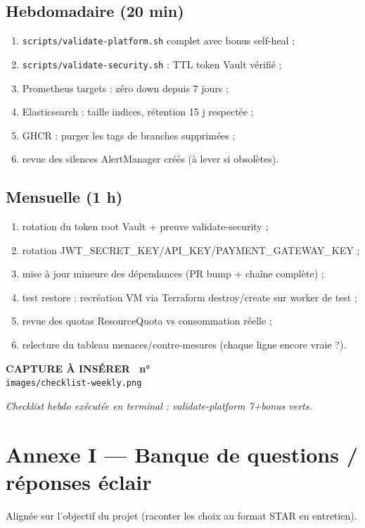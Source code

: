 \documentclass[12pt,a4paper]{article}
\newcounter{capturecount}
\newcommand{\capturebox}[2]{%
\par\vspace{4mm}
\begin{tcolorbox}[enhanced,colback=yellow!5,colframe=black!55,boxrule=0.7pt,
  borderline={0.7pt}{0pt}{black!40,dashed},
  arc=2mm,left=6pt,right=6pt,top=7pt,bottom=7pt]
\centering
{\normalsize\sffamily\bfseries CAPTURE À INSÉRER \textbar\ n°\,\stepcounter{capturecount}\thecapturecount}\\[3pt]
{\large\texttt{images/#2}}\\[7pt]
\begin{minipage}{0.94\linewidth}\centering\itshape #1\end{minipage}
\end{tcolorbox}
\par\vspace{2mm}}
\begin{document}
\subsection*{Hebdomadaire (20 min)}
\begin{enumerate}[itemsep=1pt]
  \item \texttt{scripts/validate-platform.sh} complet avec bonus self-heal ;
  \item \texttt{scripts/validate-security.sh} : TTL token Vault vérifié ;
  \item Prometheus targets : zéro down depuis 7 jours ;
  \item Elasticsearch : taille indices, rétention 15 j respectée ;
  \item GHCR : purger les tags de branches supprimées ;
  \item revue des silences AlertManager créés (à lever si obsolètes).
\end{enumerate}

\subsection*{Mensuelle (1 h)}
\begin{enumerate}[itemsep=1pt]
  \item rotation du token root Vault + preuve validate-security ;
  \item rotation JWT\_SECRET\_KEY/API\_KEY/PAYMENT\_GATEWAY\_KEY ;
  \item mise à jour mineure des dépendances (PR bump + chaîne complète) ;
  \item test restore : recréation VM via Terraform destroy/create sur worker de test ;
  \item revue des quotas ResourceQuota vs consommation réelle ;
  \item relecture du tableau menaces/contre-mesures (chaque ligne encore vraie ?).
\end{enumerate}

\capturebox{Checklist hebdo exécutée en terminal : validate-platform 7+bonus verts.}{checklist-weekly.png}

\section*{Annexe I --- Banque de questions / réponses éclair}

Alignée sur l'objectif du projet (raconter les choix au format STAR en entretien).
\end{document}
